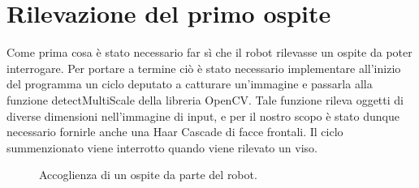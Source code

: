 \documentclass[italian, twoside]{sapthesis} %
\begin{document}
\section{Rilevazione del primo ospite}
Come prima cosa è stato necessario far sì che il robot rilevasse un ospite da poter interrogare. Per portare a termine ciò è stato necessario implementare all'inizio del programma un ciclo deputato a catturare un'immagine e passarla alla funzione detectMultiScale della libreria OpenCV. Tale funzione rileva oggetti di diverse dimensioni nell'immagine di input, e per il nostro scopo è stato dunque necessario fornirle anche una Haar Cascade di facce frontali. Il ciclo summenzionato viene interrotto quando viene rilevato un viso.

\begin{figure}[H]
    \centering
    \caption{Accoglienza di un ospite da parte del robot.}
    \label{fig:accoglienza}
\end{figure}
\end{document}
